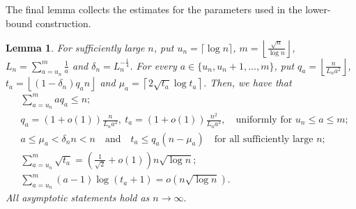 \documentclass[12pt,a4paper]{amsart}
\numberwithin{equation}{section}
\theoremstyle{plain}
\newtheorem{lm}[thm]{Lemma}
\theoremstyle{definition}
\theoremstyle{remark}
\begin{document}
The final lemma collects the estimates for the parameters used in the lower-bound construction.


\begin{lm}\label{lm: lower bound parameters}
For sufficiently large $n$, put $u_n=\lceil\log n\rceil$, $m=\left\lfloor\tfrac{\sqrt n}{\log n}\right\rfloor$, $L_n=\sum_{a=u_n}^{m}\tfrac1a$ and $\delta_n=L_n^{-\tfrac14}$. For every $a\in\{u_n,u_n+1,\ldots,m\}$, put $q_a=\left\lfloor\tfrac{n}{L_na^2}\right\rfloor$, $t_a=\left\lfloor(1-\delta_n)q_an\right\rfloor$ and $\mu_a=\left\lceil2\sqrt{t_a}\log t_a\right\rceil$. Then, we have that
\begin{align}
    &\sum_{a=u_n}^{m}a q_a\le  n;\label{ineq:reserved-height} \\
    &q_a=(1+o(1))\tfrac{n}{L_na^2},\
t_a=(1+o(1))\tfrac{n^2}{L_na^2},\quad\text{uniformly for $u_n\le  a\le  m$};\label{eq: uniform}\\
&a\le  \mu_a<\delta_n n<n
\quad\text{and}\quad
t_a\le  q_a(n-\mu_a)\quad\text{for all sufficiently large }n;\label{ineq:packing-conditions}\\
&\sum_{a=u_n}^{m}\sqrt{t_a}=\left(\tfrac1{\sqrt2}+o(1)\right)n\sqrt{\log n};\label{eq:sqrt-ta-sum}\\
&\sum_{a=u_n}^{m}(a-1)\log(t_a+1)=o(n\sqrt{\log n}).\label{eq:small-parts-error}
\end{align}
All asymptotic statements hold as $n\to \infty.$

\end{lm}
\end{document}
